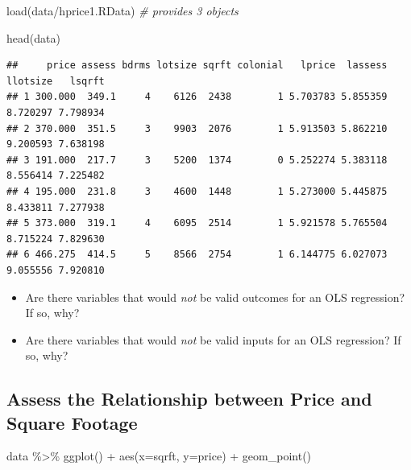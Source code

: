 \documentclass[
]{book}
\newenvironment{Shaded}{\begin{snugshade}}{\end{snugshade}}
\newcommand{\AttributeTok}[1]{\textcolor[rgb]{0.77,0.63,0.00}{#1}}
\newcommand{\CommentTok}[1]{\textcolor[rgb]{0.56,0.35,0.01}{\textit{#1}}}
\newcommand{\FunctionTok}[1]{\textcolor[rgb]{0.00,0.00,0.00}{#1}}
\newcommand{\NormalTok}[1]{#1}
\newcommand{\SpecialCharTok}[1]{\textcolor[rgb]{0.00,0.00,0.00}{#1}}
\newcommand{\StringTok}[1]{\textcolor[rgb]{0.31,0.60,0.02}{#1}}
\providecommand{\tightlist}{%
  \setlength{\itemsep}{0pt}\setlength{\parskip}{0pt}}
\theoremstyle{definition}
\theoremstyle{definition}
\theoremstyle{definition}
\theoremstyle{definition}
\theoremstyle{remark}
\begin{document}
\begin{Shaded}
\begin{Highlighting}[]
\FunctionTok{load}\NormalTok{(}\StringTok{\textquotesingle{}data/hprice1.RData\textquotesingle{}}\NormalTok{) }\CommentTok{\# provides 3 objects }
\end{Highlighting}
\end{Shaded}

\begin{Shaded}
\begin{Highlighting}[]
\FunctionTok{head}\NormalTok{(data)}
\end{Highlighting}
\end{Shaded}

\begin{verbatim}
##     price assess bdrms lotsize sqrft colonial   lprice  lassess llotsize   lsqrft
## 1 300.000  349.1     4    6126  2438        1 5.703783 5.855359 8.720297 7.798934
## 2 370.000  351.5     3    9903  2076        1 5.913503 5.862210 9.200593 7.638198
## 3 191.000  217.7     3    5200  1374        0 5.252274 5.383118 8.556414 7.225482
## 4 195.000  231.8     3    4600  1448        1 5.273000 5.445875 8.433811 7.277938
## 5 373.000  319.1     4    6095  2514        1 5.921578 5.765504 8.715224 7.829630
## 6 466.275  414.5     5    8566  2754        1 6.144775 6.027073 9.055556 7.920810
\end{verbatim}

\begin{itemize}
\tightlist
\item
  Are there variables that would \emph{not} be valid outcomes for an OLS regression? If so, why?
\item
  Are there variables that would \emph{not} be valid inputs for an OLS regression? If so, why?
\end{itemize}

\hypertarget{assess-the-relationship-between-price-and-square-footage}{%
\subsection{Assess the Relationship between Price and Square Footage}\label{assess-the-relationship-between-price-and-square-footage}}

\begin{Shaded}
\begin{Highlighting}[]
\NormalTok{data }\SpecialCharTok{\%\textgreater{}\%} 
  \FunctionTok{ggplot}\NormalTok{() }\SpecialCharTok{+} 
  \FunctionTok{aes}\NormalTok{(}\AttributeTok{x=}\NormalTok{sqrft, }\AttributeTok{y=}\NormalTok{price) }\SpecialCharTok{+} 
  \FunctionTok{geom\_point}\NormalTok{()}
\end{Highlighting}
\end{Shaded}
\end{document}
